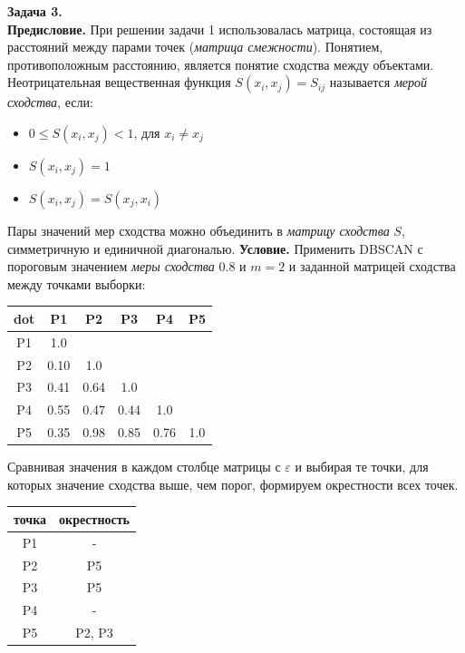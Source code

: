 \textbf{Задача 3.}\\
\textbf{Предисловие.}
При решении задачи 1 использовалась матрица, состоящая из расстояний между парами точек (\textit{матрица смежности}). Понятием, противоположным расстоянию, является понятие сходства между объектами. Неотрицательная вещественная функция $S(x_i,x_j) = S_{ij}$ называется \textit{мерой сходства}, если:
\begin{itemize}
    \item $0 \leq S(x_i,x_j) < 1$, для $x_i \neq x_j$
    \item $S(x_i,x_j)=1$
    \item $S(x_i,x_j)=S(x_j,x_i)$
\end{itemize}
Пары значений мер сходства можно объединить в \textit{матрицу сходства} $S$, симметричную и единичной диагональю.
\textbf{Условие.}
Применить DBSCAN с пороговым значением \textit{меры сходства} 0.8 и $m = 2$ и заданной матрицей сходства между точками выборки:

\begin{center}
    \begin{tabular}{ |c|c|c|c|c|c|}
        \hline
        dot & P1   & P2   & P3   & P4   & P5  \\ \hline
        P1  & 1.0  &      &      &      &     \\ \hline
        P2  & 0.10 & 1.0  &      &      &     \\ \hline
        P3  & 0.41 & 0.64 & 1.0  &      &     \\ \hline
        P4  & 0.55 & 0.47 & 0.44 & 1.0  &     \\ \hline
        P5  & 0.35 & 0.98 & 0.85 & 0.76 & 1.0 \\ \hline
    \end{tabular}
\end{center}

Сравнивая значения в каждом столбце матрицы с $\varepsilon$ и выбирая те точки, для которых значение сходства выше, чем порог, формируем окрестности всех точек.

\begin{center}
    \begin{tabular}{ |c|c| }
        \hline
        точка & окрестность \\\hline
        P1    & -           \\ 
        P2    & P5          \\ 
        P3    & P5          \\ 
        P4    & -           \\
        P5    & P2, P3      \\
        \hline
    \end{tabular}
\end{center}

